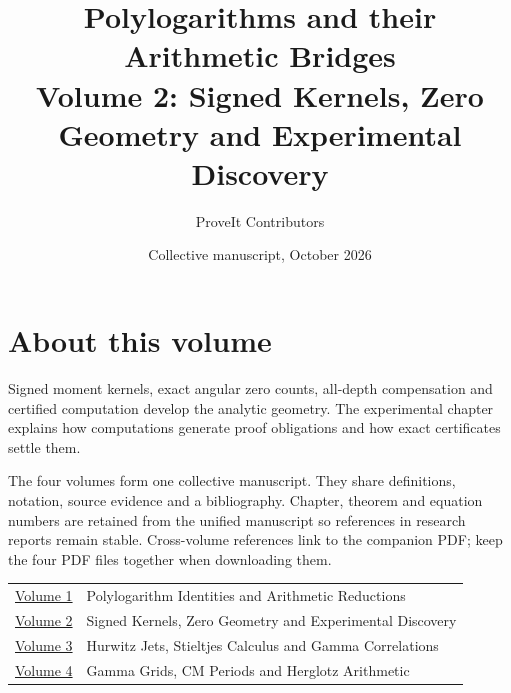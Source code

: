 

\title{Polylogarithms and their Arithmetic Bridges\\[8pt]
\large Volume 2: Signed Kernels, Zero Geometry and Experimental Discovery}
\author{ProveIt Contributors}
\date{Collective manuscript, October 2026}

\pagestyle{plain}
\frontmatter
\maketitle
\chapter*{About this volume}
Signed moment kernels, exact angular zero counts, all-depth compensation and certified computation develop the analytic geometry. The experimental chapter explains how computations generate proof obligations and how exact certificates settle them.

The four volumes form one collective manuscript. They share definitions,
notation, source evidence and a bibliography. Chapter, theorem and equation
numbers are retained from the unified manuscript so references in research
reports remain stable. Cross-volume references link to the companion PDF;
keep the four PDF files together when downloading them.

\begin{center}
\begin{tabular}{@{}p{0.8in}p{5.5in}@{}}
\href{volume-1-polylogarithm-identities.pdf}{Volume 1} & Polylogarithm Identities and Arithmetic Reductions \\
\href{volume-2-signed-kernels.pdf}{Volume 2} & Signed Kernels, Zero Geometry and Experimental Discovery \\
\href{volume-3-hurwitz-stieltjes.pdf}{Volume 3} & Hurwitz Jets, Stieltjes Calculus and Gamma Correlations \\
\href{volume-4-cm-and-herglotz.pdf}{Volume 4} & Gamma Grids, CM Periods and Herglotz Arithmetic \\
\end{tabular}
\end{center}

